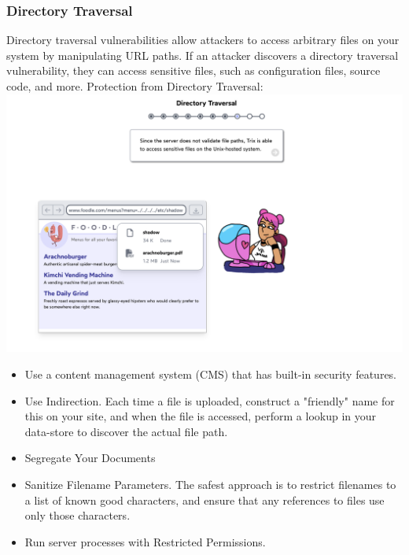 \documentclass[12pt]{article}
\begin{document}
\newpage

\subsubsection{Directory Traversal}
Directory traversal vulnerabilities allow attackers to access arbitrary files on your system by manipulating URL paths. If an attacker discovers a directory traversal vulnerability, they can access sensitive files, such as configuration files, source code, and more. Protection from Directory Traversal: \\
\includegraphics[width=.7\textwidth]{Image19.png}
\begin{itemize}
    \item Use a content management system (CMS) that has built-in security features.
    \item Use Indirection. Each time a file is uploaded, construct a "friendly" name for this on your site, and when the file is accessed, perform a lookup in your data-store to discover the actual file path.
    \item Segregate Your Documents
    \item Sanitize Filename Parameters. The safest approach is to restrict filenames to a list of known good characters, and ensure that any references to files use only those characters.
    \item Run server processes with Restricted Permissions.
\end{itemize}

\newpage
\end{document}
